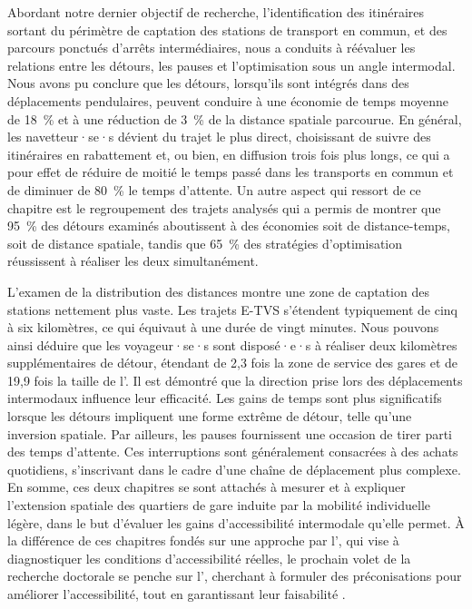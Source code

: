 \begin{refsegment}
Abordant notre dernier objectif de recherche, l'identification des itinéraires sortant du périmètre de captation des stations de transport en commun, et des parcours ponctués d'arrêts intermédiaires, nous a conduits à réévaluer les relations entre les détours, les pauses et l'optimisation sous un angle intermodal. Nous avons pu conclure que les détours, lorsqu'ils sont intégrés dans des déplacements pendulaires, peuvent conduire à une économie de temps moyenne de 18~\% et à une réduction de 3~\% de la distance spatiale parcourue. En général, les navetteur·se·s dévient du trajet le plus direct, choisissant de suivre des itinéraires en rabattement et, ou bien, en diffusion trois fois plus longs, ce qui a pour effet de réduire de moitié le temps passé dans les transports en commun et de diminuer de 80~\% le temps d'attente. Un autre aspect qui ressort de ce chapitre est le regroupement des trajets analysés qui a permis de montrer que 95~\% des détours examinés aboutissent à des économies soit de distance-temps, soit de distance spatiale, tandis que 65~\% des stratégies d'optimisation réussissent à réaliser les deux simultanément.%

L'examen de la distribution des distances montre une zone de captation des stations nettement plus vaste. Les trajets \acrshort{E-TVS} s'étendent typiquement de cinq à six kilomètres, ce qui équivaut à une durée de vingt minutes. Nous pouvons ainsi déduire que les voyageur·se·s sont disposé·e·s à réaliser deux kilomètres supplémentaires de détour, étendant de 2,3 fois la zone de service des gares et de 19,9 fois la taille de l'. Il est démontré que la direction prise lors des déplacements intermodaux influence leur efficacité. Les gains de temps sont plus significatifs lorsque les détours impliquent une forme extrême de détour, telle qu'une inversion spatiale. Par ailleurs, les pauses fournissent une occasion de tirer parti des temps d'attente. Ces interruptions sont généralement consacrées à des achats quotidiens, s'inscrivant dans le cadre d'une chaîne de déplacement plus complexe. En somme, ces deux chapitres se sont attachés à mesurer et à expliquer l’extension spatiale des quartiers de gare induite par la mobilité individuelle légère, dans le but d’évaluer les gains d’accessibilité intermodale qu’elle permet. À la différence de ces chapitres fondés sur une approche par l', qui vise à diagnostiquer les conditions d’accessibilité réelles, le prochain volet de la recherche doctorale se penche sur l', cherchant à formuler des préconisations pour améliorer l’accessibilité, tout en garantissant leur faisabilité \textcolor{blue}{\autocite[19]{levine_mobility_2019}}.%


\end{refsegment}
